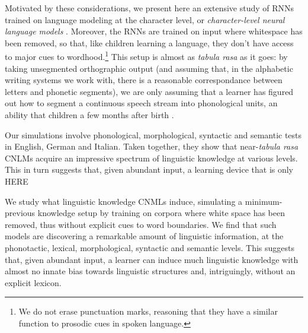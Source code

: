 Motivated by these considerations, we present here an extensive study
of RNNs trained on language modeling at the character level, or
\emph{character-level neural language models}
\cite[CNLMs,][]{Mikolov:etal:2011,Sutskever:etal:2011,Graves:2014}. Moreover,
the RNNs are trained on input where whitespace has been removed, so
that, like children learning a language, they don't have access to
major cues to wordhood.\footnote{We do not erase punctuation marks,
  reasoning that they have a similar function to prosodic cues in
  spoken language.} This setup is almost as \emph{tabula rasa} as it
goes: by taking unsegmented orthographic output (and assuming that, in
the alphabetic writing systems we work with, there is a reasonable
correspondance between letters and phonetic segments), we are only
assuming that a learner has figured out how to segment a continuous
speech stream into phonological units, an ability that children a few
months after birth \cite[e.g.,][]{Maye:etal:2002,Kuhl:2004}.

Our simulations involve phonological, morphological, syntactic and
semantic tests in English, German and Italian. Taken together, they
show that near-\emph{tabula rasa} CNLMs acquire an impressive spectrum
of linguistic knowledge at various levels.  This in turn suggests
that, given abundant input, a learning device that is only HERE

We study what linguistic knowledge CNMLs induce, simulating a
minimum-previous knowledge setup by training on corpora where white
space has been removed, thus without explicit cues to word
boundaries. We find that such models are discovering a remarkable
amount of linguistic information, at the phonotactic, lexical,
morphological, syntactic and semantic levels. This suggests that,
given abundant input, a learner can induce much linguistic knowledge
with almost no innate bias towards linguistic structures and,
intriguingly, without an explicit lexicon.


